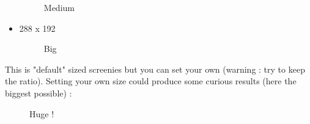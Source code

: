 \documentclass[10pt]{report}
\begin{document}
\begin{itemize}
\begin{figure}[H]
\caption{Medium}
\end{figure}
\item 288 x 192
\begin{figure}[H]
\centering
{}
\caption{Big}
\end{figure}
\end{itemize}

This is "default" sized screenies but you can set your own (warning : try to keep the ratio).\newline
Setting your own size could produce some curious results (here the biggest possible) :\newline
\begin{figure}[H]
\centering
{}
\caption{Huge !}
\end{figure}
\end{document}
